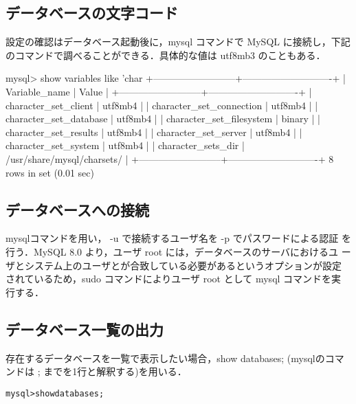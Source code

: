 \subsection*{データベースの文字コード}

設定の確認はデータベース起動後に，mysql コマンドで MySQL に接続し，下記
のコマンドで調べることができる．具体的な値は utf8mb3 のこともある．

\begin{cli}
mysql> show variables like 'char%
+--------------------------+----------------------------+
| Variable_name            | Value                      |
+--------------------------+----------------------------+
| character_set_client     | utf8mb4                    |
| character_set_connection | utf8mb4                    |
| character_set_database   | utf8mb4                    |
| character_set_filesystem | binary                     |
| character_set_results    | utf8mb4                    |
| character_set_server     | utf8mb4                    |
| character_set_system     | utf8mb4                    |
| character_sets_dir       | /usr/share/mysql/charsets/ |
+--------------------------+----------------------------+
8 rows in set (0.01 sec)
\end{cli}

\subsection*{データベースへの接続}
mysqlコマンドを用い， -u で接続するユーザ名を -p でパスワードによる認証
を行う．MySQL 8.0 より，ユーザ root には，データベースのサーバにおけるユ
ーザとシステム上のユーザとが合致している必要があるというオプションが設定
されているため，sudo コマンドによりユーザ root として mysql コマンドを実
行する．
	\begin{center}
	\end{center}
	
\subsection*{データベース一覧の出力}
存在するデータベースを一覧で表示したい場合，show databases; (mysqlのコマンドは ; までを1行と解釈する)を用いる．
	\begin{center}
	\begin{breakbox}
	\begin{alltt}
		mysql> show databases;
	\end{alltt}
	\end{breakbox}
	\end{center}

